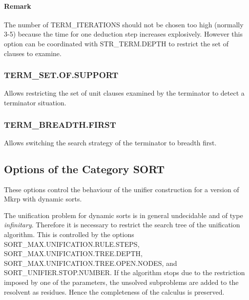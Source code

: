\paragraph{Remark}	The number of TERM\_ITERATIONS should not be chosen too high 	(normally 3-5) because the time for one deduction step 	increases explosively. However this option can be 	coordinated with 
STR\_TERM.DEPTH to restrict the set of clauses to 	examine.
 	
\subsubsection{TERM\_SET.OF.SUPPORT}
  

Allows restricting the set of unit clauses examined by the terminator
to detect a terminator situation.

\PO
{}

\subsubsection{TERM\_BREADTH.FIRST}
  

Allows switching the search strategy of the terminator to breadth
first.

\PO
{}



\subsection{Options of the Category SORT}

These options control the behaviour of the unifier 
construction for a version of {\sc Mkrp} with dynamic sorts.

The unification problem for dynamic sorts is in general undecidable and
of type {\em infinitary\/}. Therefore it is necessary to restrict the search
tree of the unification algorithm. This is controlled by the options
SORT\_MAX.UNIFICATION.RULE.STEPS, SORT\_MAX.UNIFICATION.TREE.DEPTH,
SORT\_MAX.UNIFICATION.TREE.OPEN.NODES, and SORT\_UNIFIER.STOP.NUMBER. If
the algorithm stops due to the restriction imposed by one of the
parameters, the unsolved subproblems are added to the resolvent as
residues. Hence the completeness of the calculus is preserved.

